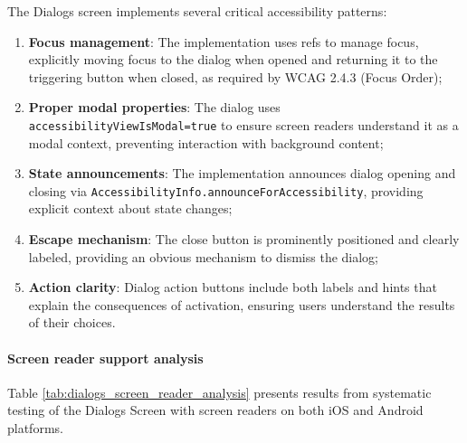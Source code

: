 The Dialogs screen implements several critical accessibility patterns:

\begin{enumerate}
    \item \textbf{Focus management}: The implementation uses refs to manage focus, explicitly moving focus to the dialog when opened and returning it to the triggering button when closed, as required by WCAG 2.4.3 (Focus Order);
    
    \item \textbf{Proper modal properties}: The dialog uses \texttt{accessibilityViewIsModal=true} to ensure screen readers understand it as a modal context, preventing interaction with background content;
    
    \item \textbf{State announcements}: The implementation announces dialog opening and closing via \texttt{AccessibilityInfo.announceForAccessibility}, providing explicit context about state changes;
    
    \item \textbf{Escape mechanism}: The close button is prominently positioned and clearly labeled, providing an obvious mechanism to dismiss the dialog;
    
    \item \textbf{Action clarity}: Dialog action buttons include both labels and hints that explain the consequences of activation, ensuring users understand the results of their choices.
\end{enumerate}

\paragraph{Screen reader support analysis}

Table \ref{tab:dialogs_screen_reader_analysis} presents results from systematic testing of the Dialogs Screen with screen readers on both iOS and Android platforms.

